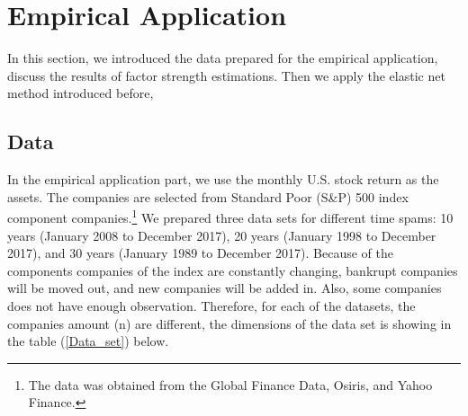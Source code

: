 




%
	\section{Empirical Application}\label{Empirical}

	In this section, we introduced the data prepared for the empirical application, discuss the results of factor strength estimations. Then we apply the elastic net method introduced before, 
	\subsection{Data}\label{data}
	
In the empirical application part, we use the monthly U.S. stock return as the assets.
The companies are selected from Standard Poor (S\&P) 500 index component companies.\footnote{The data was obtained from the Global Finance Data, Osiris, and Yahoo Finance.}
We prepared three data sets for different time spams: 10 years (January 2008 to December 2017), 20 years (January 1998 to December 2017), and 30 years (January 1989 to December 2017).
Because of the components companies of the index are constantly changing, bankrupt companies will be moved out, and new companies will be added in.
Also, some companies does not have enough observation.
Therefore, for each of the datasets, the companies amount (n) are different, the dimensions of the data set is showing in the table (\ref{Data_set}) below.

